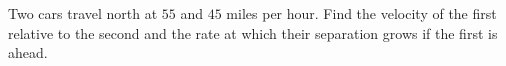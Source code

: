 Two cars travel north at $55$ and $45$ miles per hour. Find the velocity of the first relative to the second and the rate at which their separation grows if the first is ahead.
